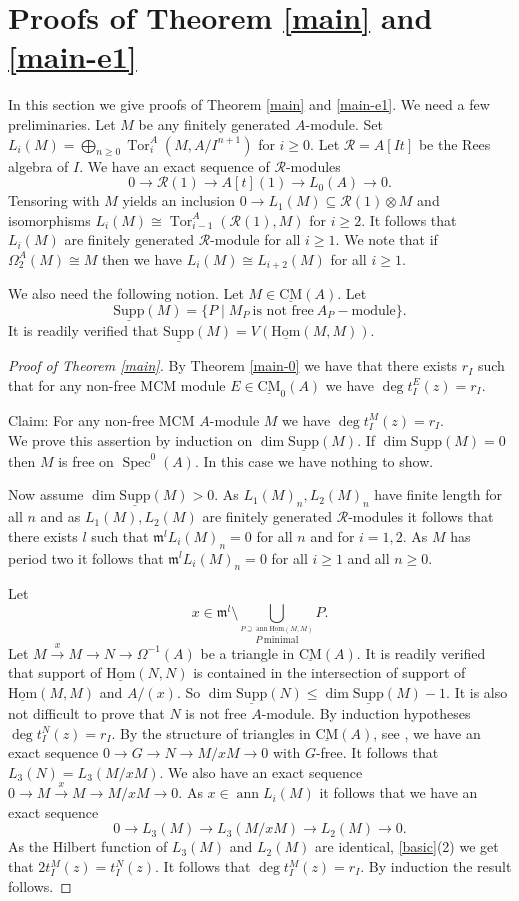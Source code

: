 \documentclass{amsart}
\newcommand{\m}{\mathfrak{m} }
\newcommand{\R}{\mathcal{R} }
\newcommand{\rt}{\rightarrow}
\newcommand{\Om}{\Omega}
\newcommand{\Tor}{\operatorname{Tor}}
\newcommand{\ann}{\operatorname{ann}}
\newcommand{\Supp}{\operatorname{\underline{Supp}}}
\newcommand{\Spec}{\operatorname{Spec}}
\newcommand{\CMS}{\operatorname{\underline{CM}}}
\newcommand{\sHom}{\operatorname{\underline{Hom}}}
\theoremstyle{plain}
\theoremstyle{definition}
\theoremstyle{remark}
\begin{document}
\section{Proofs of Theorem \ref{main} and \ref{main-e1}}
In this section we give proofs of Theorem \ref{main} and \ref{main-e1}. We need a few preliminaries.
\s  Let $M$ be any finitely generated $A$-module.  Set \\ $L_i(M) = \bigoplus_{n \geq 0}\Tor^A_i(M,  A/I^{n+1})$ for $i \geq 0$. Let $\R = A[It]$ be the Rees algebra of $I$. We have an exact sequence of $\R$-modules
$$ 0 \rt \R(1) \rt A[t](1) \rt L_0(A) \rt 0.$$
Tensoring with $M$ yields an inclusion $0 \rt L_1(M) \subseteq \R(1)\otimes M$ and isomorphisms  $L_i(M) \cong \Tor^A_{i-1}(\R(1), M)$ for $i \geq 2$. It follows that $L_i(M)$ are finitely generated $\R$-module for all $i \geq 1$. We note that if $\Om^A_2(M) \cong M$ then we have $L_i(M) \cong L_{i+2}(M)$ for all $i \geq 1$.

\s We also need the following notion. Let $M \in \CMS(A)$. Let
\[
\Supp(M) = \{ P \mid  M_P \ \text{is not free} \ A_P-\text{module} \}.
\]
It is readily verified that $\Supp(M) = V(\sHom(M, M))$.
\begin{proof}[Proof of Theorem \ref{main}]
By Theorem \ref{main-0} we have that there exists $r_I$ such that for any  non-free MCM module $E \in \CMS_0(A)$ we have $\deg t_I^E(z) = r_I$.

Claim: For any non-free MCM $A$-module $M$ we have $\deg t_I^M(z) = r_I$.\\
We prove this assertion by induction on $\dim \Supp(M)$. If $\dim \Supp(M) = 0$ then $M$ is free on $\Spec^0(A)$. In this case we have nothing to show.

Now assume $\dim \Supp(M) > 0$.
As $L_1(M)_n, L_2(M)_n$ have finite length for all $n$ and as $L_1(M), L_2(M)$ are finitely generated $\R$-modules it follows that there exists $l$ such that $\m^l L_i(M)_n = 0$ for all $n$ and for $i = 1, 2$. As $M$ has period two it follows that $\m^l L_i(M)_n = 0$ for all $i \geq 1$ and all $n \geq 0$.

Let
$$x \in \m^l \setminus \bigcup_{ \stackrel{P \supseteq \ann \sHom(M, M)}{P \ \text{minimal}}} P.$$
Let $M \xrightarrow{x} M \rt N \rt \Om^{-1}(A)$ be a triangle in $\CMS(A)$. It is readily verified that support of  $\sHom(N, N)$ is contained in the intersection of support of $\sHom(M,M)$ and $A/(x)$. So $\dim \Supp(N) \leq \dim \Supp(M) -1$. It is also not difficult to prove that $N$ is not free $A$-module. By induction hypotheses  $\deg t_I^N(z) = r_I$. By the structure of triangles in $\CMS(A)$, see \cite[4.4.1]{Buchw}, we have an exact sequence
$0 \rt G \rt N \rt M/xM \rt 0$ with $G$-free. It follows that $L_3(N) = L_3(M/xM)$. We also have an exact sequence
$0 \rt M \xrightarrow{x} M \rt M/xM \rt 0$. As $x \in \ann L_i(M)$ it follows that we have an exact sequence
$$ 0 \rt L_3(M) \rt L_3(M/xM) \rt L_2(M) \rt 0.$$
As the Hilbert function of $L_3(M)$ and $L_2(M)$ are identical, \ref{basic}(2) we get that
$2t_I^M(z) = t_I^N(z)$. It follows that $\deg t_I^M(z) = r_I$. By induction the result follows.
\end{proof}
\end{document}
